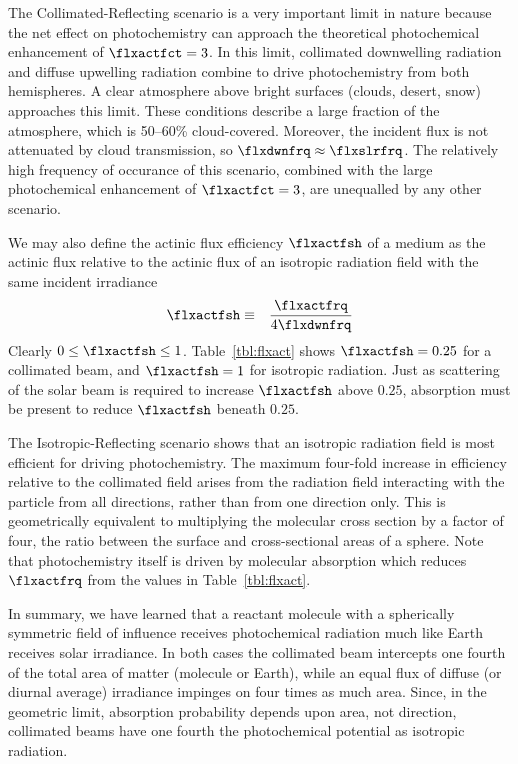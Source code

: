 \documentclass[12pt]{article}
\begin{document}
The Collimated-Reflecting scenario is a very important limit in nature
because the net effect on photochemistry can approach the theoretical
photochemical enhancement of $\flxactfct = 3$.
In this limit, collimated downwelling radiation and diffuse upwelling
radiation combine to drive photochemistry from both hemispheres.
A clear atmosphere above bright surfaces (clouds, desert, snow)
approaches this limit. 
These conditions describe a large fraction of the atmosphere, which is
50--60\% cloud-covered.  
Moreover, the incident flux is not attenuated by cloud transmission,
so $\flxdwnfrq \approx \flxslrfrq$.
The relatively high frequency of occurance of this scenario, combined
with the large photochemical enhancement of $\flxactfct = 3$, are
unequalled by any other scenario.

We may also define the actinic flux efficiency $\flxactfsh$ of a
medium as the actinic flux relative to the actinic flux of an
isotropic radiation field with the same incident irradiance 
\begin{eqnarray}
\flxactfsh & \equiv & \frac{\flxactfrq}{4 \flxdwnfrq}
\label{eqn:flx_act_fsh_dfn}
\end{eqnarray}
Clearly $0 \le \flxactfsh \le 1$.
Table~\ref{tbl:flxact} shows $\flxactfsh = 0.25$ for a collimated
beam, and $\flxactfsh = 1$ for isotropic radiation.
Just as scattering of the solar beam is required to increase
$\flxactfsh$ above $0.25$, absorption must be present to reduce
$\flxactfsh$ beneath $0.25$.

The Isotropic-Reflecting scenario shows that an isotropic radiation
field is most efficient for driving photochemistry.
The maximum four-fold increase in efficiency relative to the
collimated field arises from the radiation field interacting with the
particle from all directions, rather than from one direction only.
This is geometrically equivalent to multiplying the molecular cross
section by a factor of four, the ratio between the surface and
cross-sectional areas of a sphere.
Note that photochemistry itself is driven by molecular absorption
which reduces $\flxactfrq$ from the values in Table~\ref{tbl:flxact}.  

In summary, we have learned that a reactant molecule with a spherically
symmetric field of influence receives photochemical radiation much
like Earth receives solar irradiance.
In both cases the collimated beam intercepts one fourth of the total
area of matter (molecule or Earth), while an equal flux of diffuse (or
diurnal average) irradiance impinges on four times as much area.
Since, in the geometric limit, absorption probability depends upon
area, not direction, collimated beams have one fourth the
photochemical potential as isotropic radiation.
\end{document}
